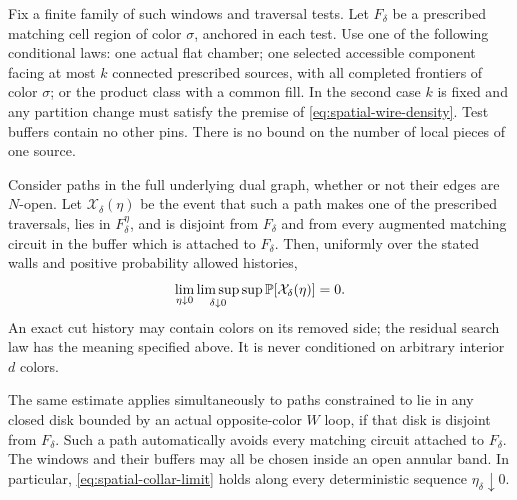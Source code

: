 \begin{lemma}\label{lem:collar}
Fix a finite family of such windows and traversal tests. Let
$F_\delta$ be a prescribed matching cell region of color
$\sigma$, anchored in each test. Use one of the following conditional
laws: one actual flat chamber; one selected accessible component facing
at most $k$ connected prescribed sources, with all completed frontiers
of color $\sigma$; or the product class with a common fill. In the second
case
$k$ is fixed and any partition change must satisfy the premise of
\eqref{eq:spatial-wire-density}. Test buffers contain no other pins.
There is no bound on the number of local pieces of one source.

Consider paths in the full underlying dual graph, whether or not their
edges are $N$-open. Let $\mathcal X_\delta(\eta)$ be the event that such
a path makes one of the prescribed traversals, lies in
$F_\delta^\eta$, and is disjoint from $F_\delta$ and from every
augmented matching circuit in the buffer which is attached to
$F_\delta$. Then, uniformly over the stated walls and positive
probability allowed histories,
\begin{equation}\label{eq:spatial-collar-limit}
 \lim_{\eta\downarrow0}\limsup_{\delta\downarrow0}
       \sup \P[\mathcal X_\delta(\eta)]=0.
\end{equation}
An exact cut history may contain colors on its removed side; the
residual search law has the meaning specified above. It is never
conditioned on arbitrary interior $d$ colors.

The same estimate applies simultaneously to paths constrained to lie
in any closed disk bounded by an actual opposite-color $W$ loop, if
that disk is disjoint from $F_\delta$. Such a path automatically avoids
every matching circuit attached to $F_\delta$. The windows and their
buffers may all be chosen inside an open annular band. In particular,
\eqref{eq:spatial-collar-limit} holds along every deterministic
sequence $\eta_\delta\downarrow0$.
\end{lemma}

